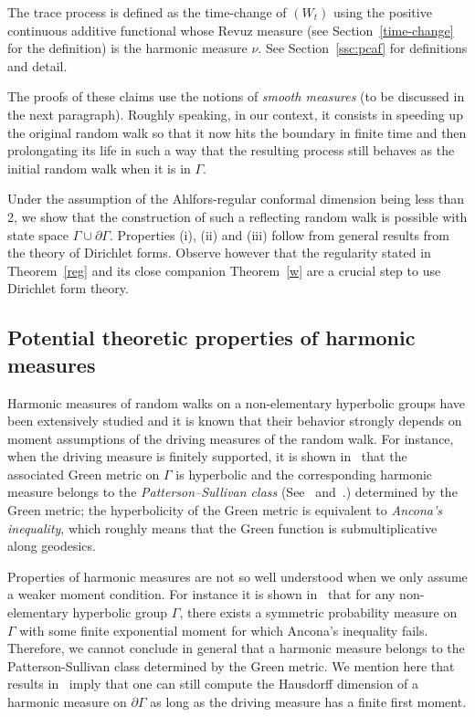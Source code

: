 \documentclass[AHL,Unicode,longabstracts,published]{cedram}
\begin{document}
The trace process is defined as the time-change of $(W_t)$ using the positive continuous additive functional whose Revuz measure (see Section~\ref{time-change} for the definition) is the harmonic measure $\nu$. See Section~\ref{ssc:pcaf} for definitions and detail.



The proofs of these claims use the notions of \emph{smooth measures} (to be discussed in the next paragraph). Roughly speaking, in our context, it consists in speeding up the original random walk so that it now hits the boundary in finite time and then prolongating its life in such a way that the resulting process still behaves as the initial random walk when it is in $\Gamma$.

Under the assumption of the Ahlfors-regular conformal dimension being less than 2, we show that the construction of such a reflecting random walk is possible with state space $\Gamma\cup\partial\Gamma$. Properties (i), (ii) and (iii) follow from general results from the theory of Dirichlet forms. Observe however that the regularity stated in Theorem~\ref{reg} and its close companion Theorem~\ref{w} are a crucial step to use Dirichlet form theory.



\subsection*{Potential theoretic properties of harmonic measures}

Harmonic measures of random walks on a non-elementary hyperbolic groups have been extensively studied and it is known that their behavior strongly depends on moment assumptions of the driving measures of the random walk. For instance, when the driving measure is finitely supported, it is shown in~\cite{BHM} that the associated Green metric on $\Gamma$ is hyperbolic and the corresponding harmonic measure belongs to the \emph{Patterson--Sullivan class} (See~\cite{Coo} and~\cite{Ha2}.) determined by the Green metric; the hyperbolicity of the Green metric is equivalent to \emph{Ancona's inequality}, which roughly means that the Green function is submultiplicative along geodesics.

Properties of harmonic measures are not so well understood when we only assume a weaker moment condition. For instance it is shown in~\cite{Gou} that for any non-elementary hyperbolic group $\Gamma$, there exists a symmetric probability measure on $\Gamma$ with some finite exponential moment for which Ancona's inequality fails. Therefore, we cannot conclude in general that a harmonic measure belongs to the Patterson-Sullivan class determined by the Green metric. We mention here that results in~\cite{T} imply that one can still compute the Hausdorff dimension of a harmonic measure on $\partial\Gamma$ as long as the driving measure has a finite first moment.
\end{document}

